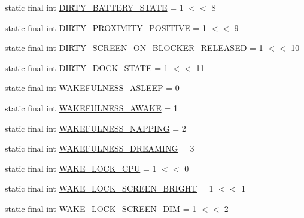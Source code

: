 \begin{DoxyCompactItemize}
\item 
static final int \hyperlink{classcom_1_1android_1_1server_1_1power_1_1PowerManagerService_a9de7ed0595caae250f0922b16c1f1b19}{D\-I\-R\-T\-Y\-\_\-\-B\-A\-T\-T\-E\-R\-Y\-\_\-\-S\-T\-A\-T\-E} = 1 $<$$<$ 8
\item 
static final int \hyperlink{classcom_1_1android_1_1server_1_1power_1_1PowerManagerService_ac9456c2d716242d6897b7167ade601b2}{D\-I\-R\-T\-Y\-\_\-\-P\-R\-O\-X\-I\-M\-I\-T\-Y\-\_\-\-P\-O\-S\-I\-T\-I\-V\-E} = 1 $<$$<$ 9
\item 
static final int \hyperlink{classcom_1_1android_1_1server_1_1power_1_1PowerManagerService_a5a42ebc9a38e113c6a58a4a2bc2ac84f}{D\-I\-R\-T\-Y\-\_\-\-S\-C\-R\-E\-E\-N\-\_\-\-O\-N\-\_\-\-B\-L\-O\-C\-K\-E\-R\-\_\-\-R\-E\-L\-E\-A\-S\-E\-D} = 1 $<$$<$ 10
\item 
static final int \hyperlink{classcom_1_1android_1_1server_1_1power_1_1PowerManagerService_acba72e0bbae68bd6432163a3268cfaf5}{D\-I\-R\-T\-Y\-\_\-\-D\-O\-C\-K\-\_\-\-S\-T\-A\-T\-E} = 1 $<$$<$ 11
\item 
static final int \hyperlink{classcom_1_1android_1_1server_1_1power_1_1PowerManagerService_a3bee8918eb0bdbdf9fdf2802afe68ad4}{W\-A\-K\-E\-F\-U\-L\-N\-E\-S\-S\-\_\-\-A\-S\-L\-E\-E\-P} = 0
\item 
static final int \hyperlink{classcom_1_1android_1_1server_1_1power_1_1PowerManagerService_a42624c0d8b944cf5b9bb5ee504bf2c1f}{W\-A\-K\-E\-F\-U\-L\-N\-E\-S\-S\-\_\-\-A\-W\-A\-K\-E} = 1
\item 
static final int \hyperlink{classcom_1_1android_1_1server_1_1power_1_1PowerManagerService_ae4479c168046860aca26cc4a8c424f06}{W\-A\-K\-E\-F\-U\-L\-N\-E\-S\-S\-\_\-\-N\-A\-P\-P\-I\-N\-G} = 2
\item 
static final int \hyperlink{classcom_1_1android_1_1server_1_1power_1_1PowerManagerService_aadfbc44d1ba017294010c88458f5e614}{W\-A\-K\-E\-F\-U\-L\-N\-E\-S\-S\-\_\-\-D\-R\-E\-A\-M\-I\-N\-G} = 3
\item 
static final int \hyperlink{classcom_1_1android_1_1server_1_1power_1_1PowerManagerService_ad024fa248d554da324071b18eb278e23}{W\-A\-K\-E\-\_\-\-L\-O\-C\-K\-\_\-\-C\-P\-U} = 1 $<$$<$ 0
\item 
static final int \hyperlink{classcom_1_1android_1_1server_1_1power_1_1PowerManagerService_af2859422370861df1b212cb46b09a92f}{W\-A\-K\-E\-\_\-\-L\-O\-C\-K\-\_\-\-S\-C\-R\-E\-E\-N\-\_\-\-B\-R\-I\-G\-H\-T} = 1 $<$$<$ 1
\item 
static final int \hyperlink{classcom_1_1android_1_1server_1_1power_1_1PowerManagerService_a4963f1b74621ae7a402d986e1668ab86}{W\-A\-K\-E\-\_\-\-L\-O\-C\-K\-\_\-\-S\-C\-R\-E\-E\-N\-\_\-\-D\-I\-M} = 1 $<$$<$ 2
$$
\end{DoxyCompactItemize}
